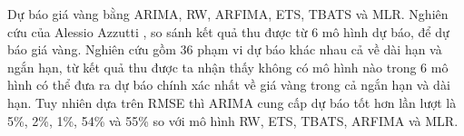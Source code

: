 Dự báo giá vàng bằng ARIMA, RW, ARFIMA, ETS, TBATS và MLR. Nghiên cứu của Alessio Azzutti\cite{azzu} , so sánh kết quả thu được từ 6 mô hình dự báo, để dự báo giá vàng. Nghiên cứu gồm 36 phạm vi dự báo khác nhau cả về dài hạn và ngắn hạn, từ kết quả thu được ta nhận thấy không có mô hình nào trong 6 mô hình có thể đưa ra dự báo chính xác nhất về giá vàng trong cả ngắn hạn và dài hạn. Tuy nhiên dựa trên RMSE thì ARIMA cung cấp dự báo tốt hơn lần lượt là 5\%, 2\%, 1\%, 54\% và 55\% so với mô hình RW, ETS, TBATS, ARFIMA và MLR.